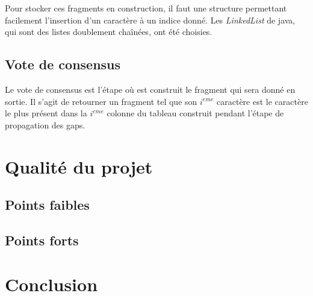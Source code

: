 \documentclass{article}
\begin{document}
Pour stocker ces fragments en construction, il faut une structure permettant facilement l'insertion d'un caractère à un indice donné. Les \textit{LinkedList} de java, qui sont des listes doublement chaînées, ont été choisies.

\subsection{Vote de consensus}

Le vote de consensus est l'étape où est construit le fragment qui sera donné en sortie. Il s'agit de retourner un fragment tel que son $i^{eme}$ caractère est le caractère le plus présent dans la $i^{eme}$ colonne du tableau construit pendant l'étape de propagation des gaps.

\section{Qualité du projet}

\subsection{Points faibles}

\subsection{Points forts}

\section{Conclusion}
\end{document}
